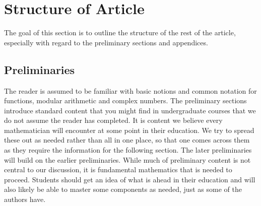 \documentclass{article}
\theoremstyle{definition}
\theoremstyle{definition}
\newtheorem{defn}{Definition}[section]
\theoremstyle{definition}
\newcommand{\Q}{\mathbb{Q}}
\begin{document}








\section{Structure of Article}
The goal of this section is to outline the structure of the rest of the article, especially with regard to the preliminary sections and appendices.

\subsection{Preliminaries}

The reader is assumed to be familiar with basic notions and common notation for functions, modular arithmetic and complex numbers.
\newline\newline
The preliminary sections introduce standard content that you might find in undergraduate courses that we do not assume the reader has completed. It is content we believe every mathematician will encounter at some point in their education. We try to spread these out as needed rather than all in one place, so that one comes across them as they require the information for the following section. The later preliminaries will build on the earlier preliminaries.
\newline\newline
 While much of preliminary content is not central to our discussion, it is fundamental mathematics that is needed to proceed. Students should get an idea of what is ahead in their education and will also likely be able to master some components as needed, just as some of the authors have. %





\end{document}
